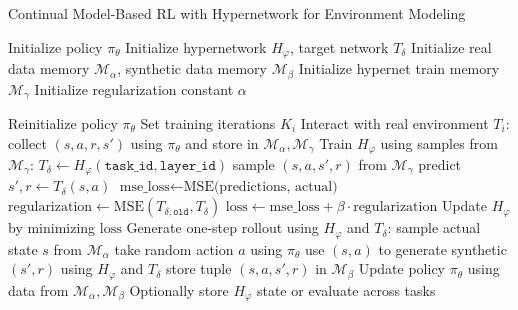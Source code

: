 \begin{algorithm}[ht]
\caption{Continual Model-Based RL with Hypernetwork for Environment Modeling}
\label{alg:hypernet-rl}
\begin{algorithmic}[1]

\State Initialize policy $\pi_{\theta}$
\State Initialize hypernetwork $H_{\varphi}$, target network $T_{\delta}$
\State Initialize real data memory $\mathcal{M}_{\alpha}$, synthetic data memory $\mathcal{M}_{\beta}$
\State Initialize hypernet train memory $\mathcal{M}_{\gamma}$
\State Initialize regularization constant $\alpha$

    \State Reinitialize policy $\pi_{\theta}$
    \State Set training iterations $K_i$
        \State Interact with real environment $T_i$: collect $(s, a, r, s')$ using $\pi_{\theta}$ and store in $\mathcal{M}_{\alpha}, \mathcal{M}_{\gamma}$
        \State Train $H_{\varphi}$ using samples from $\mathcal{M}_{\gamma}$:
        \State \quad $T_{\delta} \gets H_{\varphi}(\texttt{task\_id}, \texttt{layer\_id})$
        \State \quad sample $(s,a,s',r)$ from $\mathcal{M}_{\gamma}$
        \State \quad predict $s', r \gets T_{\delta}(s,a)$
        \State \quad $\text{mse\_loss} \gets \text{MSE(predictions, actual)}$
        \State \quad $\text{regularization} \gets \text{MSE}(T_{\delta,\texttt{old}}, T_{\delta})$
        \State \quad $\text{loss} \gets \text{mse\_loss} + \beta \cdot \text{regularization}$
        \State \quad Update $H_{\varphi}$ by minimizing $\text{loss}$
        \State Generate one-step rollout using $H_{\varphi}$ and $T_{\delta}$:
        \State \quad sample actual state $s$ from $\mathcal{M}_{\alpha}$
        \State \quad take random action $a$ using $\pi_{\theta}$
        \State \quad use $(s,a)$ to generate synthetic $(s',r)$ using $H_{\varphi}$ and $T_{\delta}$
        \State \quad store tuple $(s,a,s',r)$ in $\mathcal{M}_{\beta}$
        \State Update policy $\pi_{\theta}$ using data from $\mathcal{M}_{\alpha}, \mathcal{M}_{\beta}$
    \EndFor
    \State Optionally store $H_{\varphi}$ state or evaluate across tasks
\EndFor

\end{algorithmic}
\end{algorithm}
